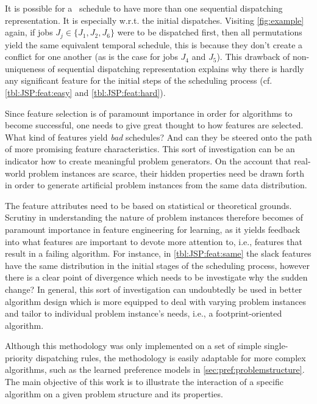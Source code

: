 It is possible for a \JSP\ schedule to have more than one sequential dispatching representation. It is especially w.r.t. the initial dispatches. Visiting \cref{fig:example} again, if jobs $J_j\in\{J_1,J_2,J_6\}$ were to be dispatched first, then all permutations yield the same equivalent temporal schedule, this is because they don't create a conflict for one another (as is the case for jobs $J_4$ and $J_5$). This drawback of non-uniqueness of sequential dispatching representation explains why there is hardly any significant feature for the initial steps of the scheduling process (cf. \cref{tbl:JSP:feat:easy} and \cref{tbl:JSP:feat:hard}). 

Since feature selection is of paramount importance in order for algorithms to become successful, one needs to give great thought to how features are selected. What kind of features yield \emph{bad} schedules? And can they be steered onto the path of more promising feature characteristics. This sort of investigation can be an indicator how to create meaningful problem generators. On the account that real-world problem instances are scarce, their hidden properties need be drawn forth in order to generate artificial problem instances from the same data distribution. 

The feature attributes need to be based on statistical or theoretical grounds. 
Scrutiny in understanding the nature of problem instances therefore becomes of paramount importance in feature engineering for learning, as it yields feedback into what features are important to devote more attention to, i.e., features that result in a failing algorithm. 
For instance, in \cref{tbl:JSP:feat:same} the slack features have the same distribution in the initial stages of the scheduling process, however there is a clear point of divergence which needs to be investigate why the sudden change? 
In general, this sort of investigation can undoubtedly be used in better algorithm design which is more equipped to deal with varying problem instances and tailor to individual problem instance's needs, i.e., a footprint-oriented algorithm. 

Although this methodology was only implemented on a set of simple single-priority dispatching rules, the methodology is easily adaptable for more complex algorithms, such as the learned preference models in \cref{sec:pref:problemstructure}. The main objective of this work is to illustrate the interaction of a specific algorithm on a given problem structure and its properties. 